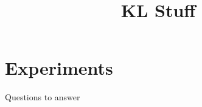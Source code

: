 \documentclass{article}
\title{KL Stuff}
\date{}
\begin{document}
\maketitle

\section{Experiments}

Questions to answer
\begin{itemize}
    
    
    
    

\end{itemize}
\end{document}

